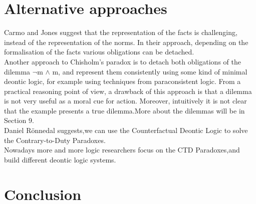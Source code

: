 \documentclass{article}
\begin{document}
\section{Alternative approaches}
Carmo and Jones \cite{5} suggest that the representation of the facts is challenging,
instead of the representation of the norms. In their approach, depending on the
formalisation of the facts various obligations can be detached.\\
Another approach to Chisholm’s paradox is to detach both obligations of the
dilemma  $\neg$m $\wedge$ m, and represent them consistently using some kind of minimal
deontic logic, for example using techniques from paraconsistent logic. From a practical reasoning point of view, a drawback of this approach is that a dilemma is not
very useful as a moral cue for action. Moreover, intuitively it is not clear that the
example presents a true dilemma.More about the dilemmas will be in Section 9.\\

Daniel Rönnedal\cite{6} suggests,we can use the Counterfactual Deontic Logic to solve the Contrary-to-Duty Paradoxes.\\
Nowadays more and more logic researchers focus on the CTD Paradoxes,and build different
deontic logic systems.
\section{Conclusion}




\end{document}
